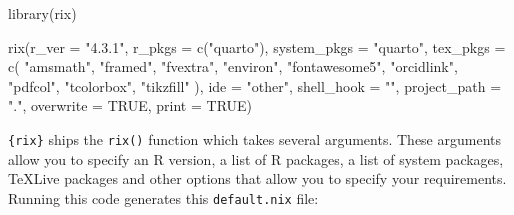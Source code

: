 \documentclass[
  letterpaper,
  paper=6in:9in,
  pagesize=pdftex,
  headinclude=on,
  footinclude=on,
  12pt]{scrbook}
\newenvironment{Shaded}{\begin{snugshade}}{\end{snugshade}}
\newcommand{\AttributeTok}[1]{\textcolor[rgb]{0.40,0.45,0.13}{#1}}
\newcommand{\ConstantTok}[1]{\textcolor[rgb]{0.56,0.35,0.01}{#1}}
\newcommand{\FunctionTok}[1]{\textcolor[rgb]{0.28,0.35,0.67}{#1}}
\newcommand{\NormalTok}[1]{\textcolor[rgb]{0.00,0.23,0.31}{#1}}
\newcommand{\StringTok}[1]{\textcolor[rgb]{0.13,0.47,0.30}{#1}}
\begin{document}
\begin{Shaded}
\begin{Highlighting}[]
\FunctionTok{library}\NormalTok{(rix)}

\FunctionTok{rix}\NormalTok{(}\AttributeTok{r\_ver =} \StringTok{"4.3.1"}\NormalTok{,}
    \AttributeTok{r\_pkgs =} \FunctionTok{c}\NormalTok{(}\StringTok{"quarto"}\NormalTok{),}
    \AttributeTok{system\_pkgs =} \StringTok{"quarto"}\NormalTok{,}
    \AttributeTok{tex\_pkgs =} \FunctionTok{c}\NormalTok{(}
      \StringTok{"amsmath"}\NormalTok{,}
      \StringTok{"framed"}\NormalTok{,}
      \StringTok{"fvextra"}\NormalTok{,}
      \StringTok{"environ"}\NormalTok{,}
      \StringTok{"fontawesome5"}\NormalTok{,}
      \StringTok{"orcidlink"}\NormalTok{,}
      \StringTok{"pdfcol"}\NormalTok{,}
      \StringTok{"tcolorbox"}\NormalTok{,}
      \StringTok{"tikzfill"}
\NormalTok{    ),}
    \AttributeTok{ide =} \StringTok{"other"}\NormalTok{,}
    \AttributeTok{shell\_hook =} \StringTok{""}\NormalTok{,}
    \AttributeTok{project\_path =} \StringTok{"."}\NormalTok{,}
    \AttributeTok{overwrite =} \ConstantTok{TRUE}\NormalTok{,}
    \AttributeTok{print =} \ConstantTok{TRUE}\NormalTok{)}
\end{Highlighting}
\end{Shaded}

\texttt{\{rix\}} ships the \texttt{rix()} function which takes several
arguments. These arguments allow you to specify an R version, a list of
R packages, a list of system packages, TeXLive packages and other
options that allow you to specify your requirements. Running this code
generates this \texttt{default.nix} file:
\end{document}
